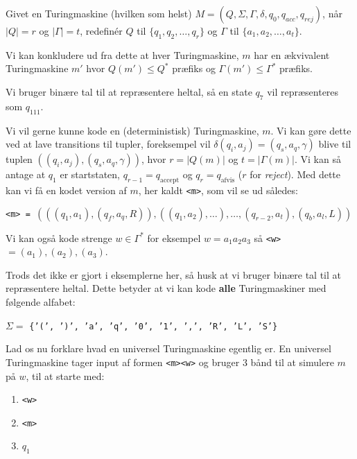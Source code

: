 Givet en Turingmaskine (hvilken som helst) $M = (Q, \Sigma, \Gamma, \delta, q_{0}, q_{acc}, q_{rej})$, når $|Q| = r$ og $|\Gamma| = t$, redefinér $Q$ til $\{q_{1}, q_{2}, \ldots, q_{r}\}$ og $\Gamma$ til $\{a_{1}, a_{2}, \ldots, a_{t}\}$.

Vi kan konkludere ud fra dette at hver Turingmaskine, $m$ har en ækvivalent Turingmaskine $m'$ hvor $Q(m') \le Q^{*}$ præfiks og $\Gamma(m') \le \Gamma^{*}$ præfiks.

Vi bruger binære tal til at repræsentere heltal, så en state $q_{7}$ vil repræsenteres som $q_{111}$.

Vi vil gerne kunne kode en (deterministisk) Turingmaskine, $m$. Vi kan gøre dette ved at lave transitions til tupler, foreksempel vil $\delta(q_{i}, a_{j}) = (q_{s}, a_{q}, \gamma)$ blive til tuplen $((q_{i}, a_{j}), (q_{s}, a_{q}, \gamma))$, hvor $r = |Q(m)|$ og $t = |\Gamma(m)|$. Vi kan så antage at $q_{1}$ er startstaten, $q_{r-1} = q_{\text{accept}}$  og $q_{r} = q_{\text{afvis}}$ ($r$ for \textit{reject}). Med dette kan vi få en kodet version af $m$, her kaldt \texttt{<m>}, som vil se ud således:

\begin{center}
	\texttt{<m> = }$(((q_{1}, a_{1}), (q_{f}, a_{q}, R)), ((q_{1}, a_{2}), \ldots), \ldots, (q_{r-2}, a_{t}), (q_{b}, a_{l}, L))$
\end{center}

Vi kan også kode strenge $w \in \Gamma^{*}$ for eksempel $w = a_{1}a_{2}a_{3}$ så \texttt{<w>} $= (a_{1}),(a_{2}),(a_{3})$.

Trods det ikke er gjort i eksemplerne her, så husk at vi bruger binære tal til at repræsentere heltal. Dette betyder at vi kan kode \textbf{alle} Turingmaskiner med følgende alfabet:
\begin{center}
	$\Sigma =$ \texttt{\{'(', ')', 'a', 'q', '0', '1', ',', 'R', 'L', 'S'\}}
\end{center}

Lad os nu forklare hvad en universel Turingmaskine egentlig er. En universel Turingmaskine tager input af formen \texttt{<m><w>} og bruger 3 bånd til at simulere $m$ på $w$, til at starte med:
\begin{enumerate}
	\item \texttt{<w>}
	\item \texttt{<m>}
	\item $q_{1}$
\end{enumerate}

